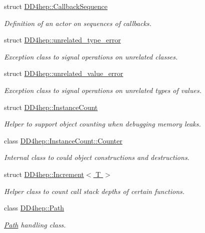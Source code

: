 \begin{DoxyCompactItemize}
struct \hyperlink{struct_d_d4hep_1_1_callback_sequence}{DD4hep::CallbackSequence}
\begin{DoxyCompactList}\small\item\em Definition of an actor on sequences of callbacks. \item\end{DoxyCompactList}\item 
struct \hyperlink{struct_d_d4hep_1_1unrelated__type__error}{DD4hep::unrelated\_\-type\_\-error}
\begin{DoxyCompactList}\small\item\em Exception class to signal operations on unrelated classes. \item\end{DoxyCompactList}\item 
struct \hyperlink{struct_d_d4hep_1_1unrelated__value__error}{DD4hep::unrelated\_\-value\_\-error}
\begin{DoxyCompactList}\small\item\em Exception class to signal operations on unrelated types of values. \item\end{DoxyCompactList}\item 
struct \hyperlink{struct_d_d4hep_1_1_instance_count}{DD4hep::InstanceCount}
\begin{DoxyCompactList}\small\item\em Helper to support object counting when debugging memory leaks. \item\end{DoxyCompactList}\item 
class \hyperlink{class_d_d4hep_1_1_instance_count_1_1_counter}{DD4hep::InstanceCount::Counter}
\begin{DoxyCompactList}\small\item\em Internal class to could object constructions and destructions. \item\end{DoxyCompactList}\item 
struct \hyperlink{struct_d_d4hep_1_1_increment}{DD4hep::Increment$<$ T $>$}
\begin{DoxyCompactList}\small\item\em Helper class to count call stack depths of certain functions. \item\end{DoxyCompactList}\item 
class \hyperlink{class_d_d4hep_1_1_path}{DD4hep::Path}
\begin{DoxyCompactList}\small\item\em \hyperlink{class_d_d4hep_1_1_path}{Path} handling class. \item\end{DoxyCompactList}\item 

\end{DoxyCompactItemize}
